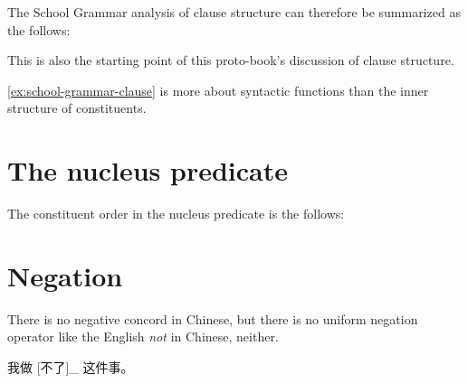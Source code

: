 \documentclass[../main.tex]{subfiles}
\begin{document}
The School Grammar analysis of clause structure can therefore be summarized as the follows:
\begin{exe}
    \ex\label{ex:school-grammar-clause} 
    
\end{exe}
This is also the starting point of this proto-book's discussion of clause structure. 

\eqref{ex:school-grammar-clause} is more about syntactic functions than the inner structure of constituents.

\section{The nucleus predicate}

The constituent order in the nucleus predicate is the follows:
\begin{exe}
    \ex 
\end{exe}

\section{Negation}

There is no negative concord in Chinese, but there is no uniform negation operator like the English 
\emph{not} in Chinese, neither. 

\begin{exe}
    \ex \begin{xlist}
        \ex 我做 [不了]_{} 这件事。
    \end{xlist}    
\end{exe}

\end{document}
